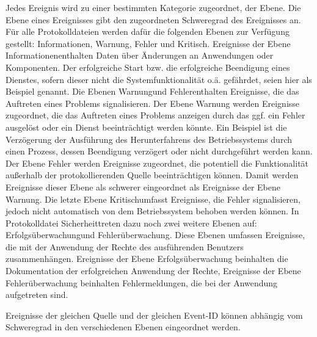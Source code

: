 Jedes Ereignis wird zu einer bestimmten Kategorie zugeordnet, der Ebene. Die Ebene eines Ereignisses gibt den zugeordneten Schweregrad des Ereignisses an. Für alle Protokolldateien werden dafür die folgenden Ebenen zur Verfügung gestellt: Informationen, Warnung, Fehler und Kritisch. Ereignisse der Ebene \glqq Informationen\grqq  enthalten Daten über Änderungen an Anwendungen oder Komponenten. Der erfolgreiche Start bzw. die erfolgreiche Beendigung eines Dienstes, sofern dieser nicht die Systemfunktionalität o.ä. gefährdet, seien hier als Beispiel genannt. Die Ebenen \glqq Warnung\grqq  und \glqq Fehler\grqq  enthalten Ereignisse, die das Auftreten eines Problems signalisieren. Der Ebene Warnung werden Ereignisse zugeordnet, die das Auftreten eines Problems anzeigen durch das ggf. ein Fehler ausgelöst oder ein Dienst beeinträchtigt werden könnte. Ein Beispiel ist die Verzögerung der Ausführung des Herunterfahrens des Betriebssystems durch einen Prozess, dessen Beendigung verzögert oder nicht durchgeführt werden kann. Der Ebene Fehler werden Ereignisse zugeordnet, die potentiell die Funktionalität außerhalb der protokollierenden Quelle beeinträchtigen können. Damit werden Ereignisse dieser Ebene als schwerer eingeordnet als Ereignisse der Ebene Warnung. Die letzte Ebene \glqq Kritisch\grqq   umfasst Ereignisse, die Fehler signalisieren, jedoch nicht automatisch von dem Betriebssystem behoben werden können. 
In Protokolldatei \glqq Sicherheit\grqq  treten dazu noch zwei weitere Ebenen auf: \glqq Erfolgsüberwachung\grqq  und \glqq Fehlerüberwachung\grqq . Diese Ebenen umfassen Ereignisse, die mit der Anwendung der Rechte des ausführenden Benutzers zusammenhängen. Ereignisse der Ebene Erfolgsüberwachung beinhalten die Dokumentation der erfolgreichen Anwendung der Rechte, Ereignisse der Ebene Fehlerüberwachung beinhalten Fehlermeldungen, die bei der Anwendung aufgetreten sind.

Ereignisse der gleichen Quelle und der gleichen Event-ID können abhängig vom Schweregrad in den verschiedenen Ebenen eingeordnet werden.

